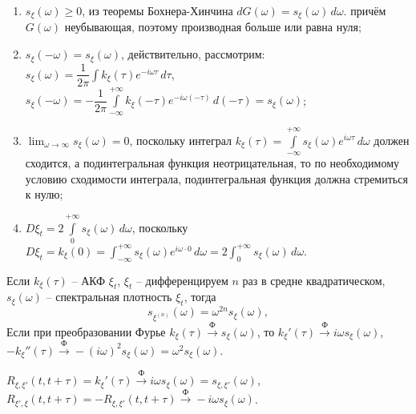 \begin{enumerate}
  \item $s_\xi(\omega) \geqslant 0$,
    из теоремы Бохнера-Хинчина $dG(\omega) = s_\xi(\omega) \, d\omega$. причём $G(\omega)$ 
    неубывающая, поэтому производная больше или равна нуля;
  \item $s_\xi(-\omega) = s_\xi(\omega)$,
    действительно, рассмотрим:
    $s_\xi(\omega) = \dfrac{1}{2\pi} \int k_\xi(\tau) e^{-i\omega\tau} \, d\tau$, 
    $s_\xi(-\omega) = - \dfrac{1}{2\pi} \int\limits_{-\infty}^{+\infty} k_\xi(-\tau) e^{-i\omega(-\tau)} \, d(-\tau) = s_\xi(\omega)$;
  \item $\lim_{\omega \to \infty} s_\xi(\omega) = 0$,
    поскольку интеграл
    $k_\xi(\tau) = \int\limits_{-\infty}^{+\infty} s_\xi(\omega) e^{i\omega\tau} \, d\omega$
    должен сходится, а подинтегральная функция неотрицательная, то по необходимому условию
    сходимости интеграла, подинтегральная функция должна стремиться к нулю;
  \item $D\xi_t = 2 \int\limits_0^{+\infty} s_\xi(\omega) \, d\omega$,
    поскольку $D\xi_t = k_\xi(0) = \int_{-\infty}^{+\infty} s_\xi(\omega) e^{i\omega \cdot 0} \, d\omega
    = 2 \int_0^{+\infty} s_\xi(\omega) \, d\omega$.
\end{enumerate}

\begin{theorem}\label{fourier-of-diff}
  Если $k_\xi(\tau)$ -- АКФ $\xi_t$, $\xi_t$ -- дифференцируем $n$ раз в средне квадратическом, $s_\xi(\omega)$ --
  спектральная плотность $\xi_t$, тогда
  \[
    s_{\xi^{(n)}} (\omega) = \omega^{2n} s_\xi(\omega),
  \]
  Если при преобразовании Фурье 
  $k_\xi(\tau) \xrightarrow{\text{Ф}} s_\xi(\omega)$, то
  $k_\xi'(\tau) \xrightarrow{\text{Ф}} i\omega s_\xi(\omega)$,
  $- k_\xi''(\tau) \xrightarrow{\text{Ф}} -(i\omega)^2 s_\xi(\omega) = \omega^2 s_\xi(\omega)$.
\end{theorem}

\begin{corollary}
  $R_{\xi, \xi'} (t, t+\tau) = k_\xi'(\tau) \xrightarrow{\text{Ф}} i\omega s_\xi(\omega) = s_{\xi,\xi'} (\omega)$,
  $R_{\xi', \xi} (t, t+\tau) = - R_{\xi, \xi'} (t, t+\tau) \xrightarrow{\text{Ф}} - i\omega s_\xi(\omega)$.
\end{corollary}

